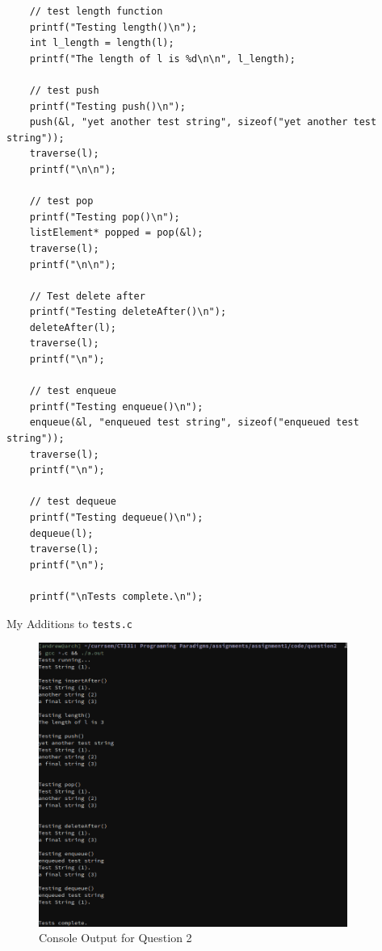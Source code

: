 \documentclass[a4paper]{article}
\newenvironment{code}{\captionsetup{type=listing, skip=0pt}}{}
\begin{document}
\begin{code}
\begin{verbatim}
    // test length function
    printf("Testing length()\n");
    int l_length = length(l);
    printf("The length of l is %d\n\n", l_length);

    // test push
    printf("Testing push()\n");
    push(&l, "yet another test string", sizeof("yet another test string"));
    traverse(l);
    printf("\n\n");

    // test pop
    printf("Testing pop()\n");
    listElement* popped = pop(&l);
    traverse(l);
    printf("\n\n");

    // Test delete after
    printf("Testing deleteAfter()\n");
    deleteAfter(l);
    traverse(l);
    printf("\n");

    // test enqueue
    printf("Testing enqueue()\n");
    enqueue(&l, "enqueued test string", sizeof("enqueued test string"));
    traverse(l);
    printf("\n");

    // test dequeue
    printf("Testing dequeue()\n");
    dequeue(l);
    traverse(l);
    printf("\n");

    printf("\nTests complete.\n");
\end{verbatim}
\caption{My Additions to \texttt{tests.c}}
\end{code}

\begin{figure}[H]
    \centering
    \includegraphics[width=0.9\textwidth]{./images/question2.png}
    \caption{Console Output for Question 2}
\end{figure}
\end{document}
